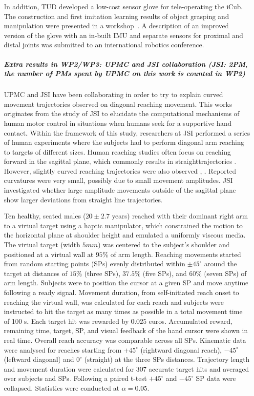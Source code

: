 In addition, TUD developed a low-cost sensor glove for tele-operating the iCub. The construction and first imitation learning results of object grasping and manipulation were presented in a workshop~\cite{RueckertICRAWS2015}. A description of an improved version of the glove with an in-built IMU and separate sensors for proximal and distal joints was submitted to an international robotics conference. 

\subparagraph{Extra results in WP2/WP3: UPMC and JSI collaboration (JSI: 2PM, the number of PMs spent by UPMC on this work is counted in WP2)}

UPMC and JSI have been collaborating in order to try to explain curved movement trajectories observed on diagonal reaching movement. This works originates from the study of JSI to elucidate the computational mechanisms of human motor control in situations when humans seek for a supportive hand contact. Within the framework of this study, researchers at JSI performed a series of human experiments where the subjects had to perform diagonal arm reaching to targets of different sizes. Human reaching studies often focus on reaching forward in the sagittal plane, which commonly results in straighttrajectories \cite{ThoroughmanNature2000}. However, slightly curved reaching trajectories were also observed \cite{IzawaJNeuro2008}, \cite{UnoBioCyber1989}. Reported curvatures were very small, possibly due to small movement amplitudes. JSI investigated whether large amplitude movements outside of the sagittal plane show larger deviations from straight line trajectories.

Ten healthy, seated males ($20 \pm 2.7$ years) reached with their dominant right arm to a virtual target using a haptic manipulator, which constrained the motion to the horizontal plane at shoulder height and emulated a uniformly viscous media. The virtual target (width $5mm$) was centered to the subject’s shoulder and positioned at a virtual wall at $95\%$ of arm length. Reaching movements started from random starting points (SPs) evenly distributed within $\pm 45^{\circ}$ around the target at distances of $15\%$ (three SPs), $37.5\%$ (five SPs), and $60\%$ (seven SPs) of arm length. Subjects were to position the cursor at a given SP and move anytime following a ready signal. Movement duration, from self-initiated reach onset to reaching the virtual wall, was calculated for each reach and subjects were instructed to hit the target as many times as possible in a total movement time of 100 s. Each target hit was rewarded by $0.025$ euros. Accumulated reward, remaining time, target, SP, and visual feedback of the hand cursor were shown in real time. Overall reach accuracy was comparable across all SPs.
Kinematic data were analysed for reaches starting from $+45^{\circ}$ (rightward diagonal reach), $-45^{\circ}$ (leftward diagonal) and $0^{\circ}$ (straight) at the three SPs distances. Trajectory length and movement duration were calculated for 307 accurate target hits and averaged over subjects and SPs. Following a paired t-test $+45^{\circ}$ and $-45^{\circ}$ SP data were collapsed. Statistics were conducted at $\alpha = 0.05$.

